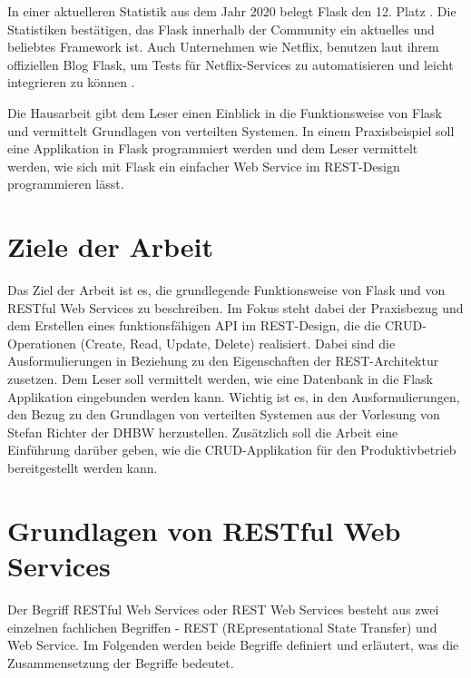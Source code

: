 \documentclass[a4paper,titlepage,halfparskip,12pt,listof=numbered]{scrreprt}
\begin{document}
\begin{onehalfspacing}
In einer aktuelleren Statistik aus dem Jahr 2020 belegt Flask den 12. Platz \cite{webframeworksStatistic}. Die Statistiken bestätigen, das Flask innerhalb der Community ein aktuelles und beliebtes Framework ist. Auch Unternehmen wie Netflix, benutzen laut ihrem offiziellen Blog Flask, um Tests für Netflix-Services zu automatisieren und leicht integrieren zu können \cite{netflixFlaskAutomation}.

Die Hausarbeit gibt dem Leser einen Einblick in die Funktionsweise von Flask und vermittelt Grundlagen von verteilten Systemen. In einem Praxisbeispiel soll eine Applikation in Flask programmiert werden und dem Leser vermittelt werden, wie sich mit Flask ein einfacher Web Service im \ac{REST}-Design programmieren lässt.

\begingroup
\renewcommand{\cleardoublepage}{}
\renewcommand{\clearpage}{}

\chapter{Ziele der Arbeit}
\label{chap:Ziele}
Das Ziel der Arbeit ist es, die grundlegende Funktionsweise von Flask und von \ac{REST}ful Web Services zu beschreiben. Im Fokus steht dabei der Praxisbezug und dem Erstellen eines funktionsfähigen \ac{API} im \ac{REST}-Design, die die CRUD-Operationen (Create, Read, Update, Delete) realisiert.  Dabei sind die Ausformulierungen in Beziehung zu den Eigenschaften der \ac{REST}-Architektur zusetzen. Dem Leser soll vermittelt werden, wie eine Datenbank in die Flask Applikation eingebunden werden kann. Wichtig ist es, in den Ausformulierungen, den Bezug zu den Grundlagen von verteilten Systemen aus der Vorlesung von Stefan Richter der \ac{DHBW} herzustellen. Zusätzlich soll die Arbeit eine Einführung darüber geben, wie die CRUD-Applikation für den Produktivbetrieb bereitgestellt werden kann.

\endgroup

\chapter{Grundlagen von \ac{REST}ful Web Services}
\label{chap:REST}

Der Begriff \ac{REST}ful Web Services oder \ac{REST} Web Services besteht aus zwei einzelnen fachlichen Begriffen - \ac{REST} (REpresentational State Transfer) und Web Service. Im Folgenden werden beide Begriffe definiert und erläutert, was die Zusammensetzung der Begriffe bedeutet.


\end{onehalfspacing}
\end{document}
